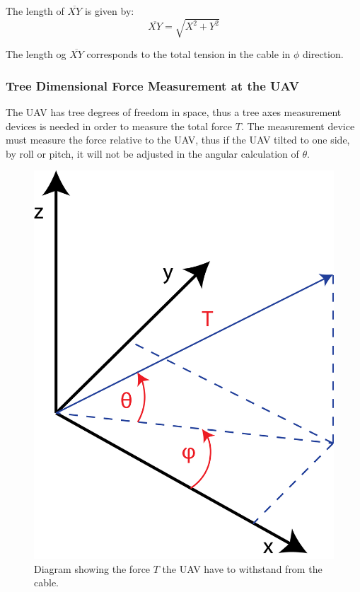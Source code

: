 \noindent
The length of $\overline{XY}$ is given by:
\begin{equation}
\overline{XY} = \sqrt{X^2+Y^2}
\end{equation}

\noindent
The length og $\overline{XY}$ corresponds to the total tension in the cable in $\phi$ direction. 

\subsubsection{Tree Dimensional Force Measurement at the UAV}
The UAV has tree degrees of freedom in space, thus a tree axes measurement devices is needed in order to measure the total force $T$.  The measurement device must measure the force relative to the UAV, thus if the UAV tilted to one side, by roll or pitch, it will not be adjusted in the angular calculation of $\theta$.  


\begin{figure}[hbtp]
\centering
\includegraphics[scale=0.5]{graphics/UAV-force-diagram.png}
\caption[Force diagram for UAV]{Diagram showing the force $T$ the UAV have to withstand from the cable.}
\end{figure}

